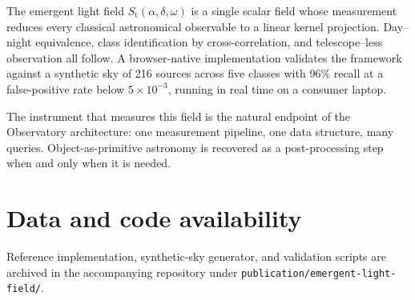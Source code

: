 \documentclass[11pt,twocolumn,a4paper]{article}
\theoremstyle{definition}
\theoremstyle{remark}
\newcommand{\Sfield}{S_{\mathrm{t}}}
\newcommand{\RA}{\alpha}
\newcommand{\Dec}{\delta}
\begin{document}
The emergent light field $\Sfield(\RA, \Dec, \omega)$ is a single
scalar field whose measurement reduces every classical astronomical
observable to a linear kernel projection. Day--night equivalence,
class identification by cross-correlation, and telescope--less
observation all follow. A browser-native implementation validates
the framework against a synthetic sky of 216 sources across five
classes with 96\% recall at a false-positive rate below
$5 \times 10^{-3}$, running in real time on a consumer laptop.

The instrument that measures this field is the natural endpoint of
the Observatory architecture: one measurement pipeline, one data
structure, many queries. Object-as-primitive astronomy is recovered
as a post-processing step when and only when it is needed.

\section*{Data and code availability}

Reference implementation, synthetic-sky generator, and validation
scripts are archived in the accompanying repository under
\texttt{publication/emergent-light-field/}.



\end{document}
